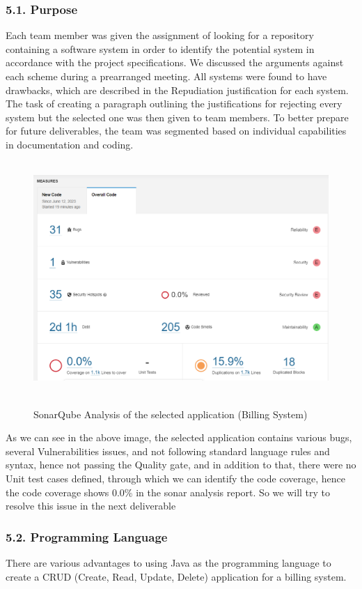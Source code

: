 \documentclass[12pt,letterpaper]{report}
\begin{document}
\subsubsection*{5.1. Purpose}
\normalsize {Each team member was given the assignment of looking for a repository containing a software system in order to identify the potential system in accordance with the project specifications. We discussed the arguments against each scheme during a prearranged meeting. All systems were found to have drawbacks, which are described in the Repudiation justification for each system. The task of creating a paragraph outlining the justifications for rejecting every system but the selected one was then given to team members. To better prepare for future deliverables, the team was segmented based on individual capabilities in documentation and coding.}
\\
\\
\begin{figure}[ht]
    \centering
    \includegraphics[width=0.8\linewidth]{Images/sonar_report.png}\
    \caption{SonarQube Analysis of the selected application (Billing System)}
    \label{fig:enter-label}
\end{figure}

\normalsize {As we can see in the above image, the selected application contains various bugs, several Vulnerabilities issues, and not following standard language rules and syntax, hence not passing the Quality gate, and in addition to that, there were no Unit test cases defined, through which we can identify the code coverage, hence the code coverage shows 0.0\% in the sonar analysis report. So we will try to resolve this issue in the next deliverable}

\pagebreak
{}
\subsubsection*{5.2. Programming Language}
\normalsize {There are various advantages to using Java as the programming language to create a CRUD (Create, Read, Update, Delete) application for a billing system.}
\end{document}
